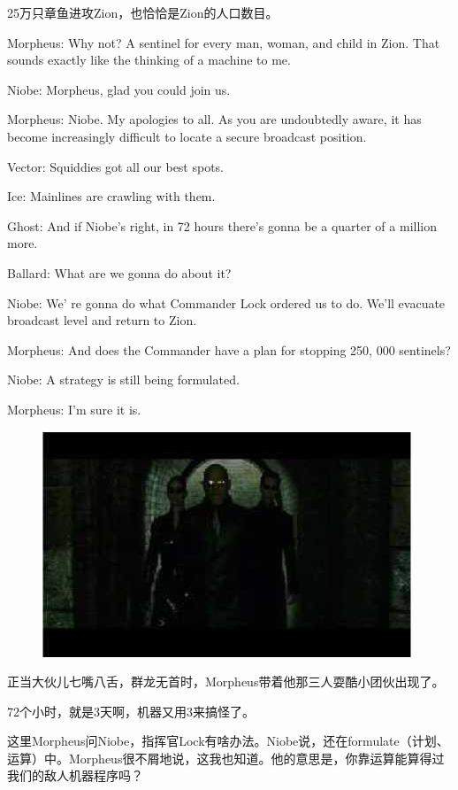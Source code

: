 \documentclass[UTF8]{ctexart}
\newenvironment{myquote}{\color{green} \setlength{\leftskip}{6em} \setlength{\rightskip}{4em} \setlength{\parindent}{-2em}}{\par}
\begin{document}
25万只章鱼进攻Zion，也恰恰是Zion的人口数目。

\begin{myquote}
Morpheus: Why not? A sentinel for every man, woman, and child in Zion. That sounds exactly like the thinking of a machine to me.

Niobe: Morpheus, glad you could join us.

Morpheus: Niobe. My apologies to all. As you are undoubtedly aware, it has become increasingly difficult to locate a secure broadcast position.

Vector: Squiddies got all our best spots.

Ice: Mainlines are crawling with them.

Ghost: And if Niobe's right, in 72 hours there's gonna be a quarter of a million more.

Ballard: What are we gonna do about it?

Niobe: We' re gonna do what Commander Lock ordered us to do. We'll evacuate broadcast level and return to Zion.

Morpheus: And does the Commander have a plan for stopping 250, 000 sentinels?

Niobe: A strategy is still being formulated.

Morpheus: I'm sure it is.
\end{myquote}

\begin{figure}[htb]
\centering
\includegraphics[width=0.5\linewidth]{fig/read_reloaded-16}
\end{figure}

正当大伙儿七嘴八舌，群龙无首时，Morpheus带着他那三人耍酷小团伙出现了。

72个小时，就是3天啊，机器又用3来搞怪了。

这里Morpheus问Niobe，指挥官Lock有啥办法。Niobe说，还在formulate（计划、运算）中。Morpheus很不屑地说，这我也知道。他的意思是，你靠运算能算得过我们的敌人机器程序吗？
\end{document}

